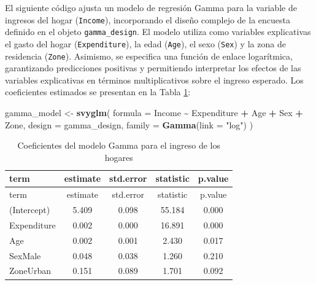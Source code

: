 \documentclass[
  spanish,
  12pt,
]{book}
\newenvironment{Shaded}{\begin{snugshade}}{\end{snugshade}}
\newcommand{\AttributeTok}[1]{\textcolor[rgb]{0.13,0.29,0.53}{#1}}
\newcommand{\FunctionTok}[1]{\textcolor[rgb]{0.13,0.29,0.53}{\textbf{#1}}}
\newcommand{\NormalTok}[1]{#1}
\newcommand{\OtherTok}[1]{\textcolor[rgb]{0.56,0.35,0.01}{#1}}
\newcommand{\SpecialCharTok}[1]{\textcolor[rgb]{0.81,0.36,0.00}{\textbf{#1}}}
\newcommand{\StringTok}[1]{\textcolor[rgb]{0.31,0.60,0.02}{#1}}
\begin{document}
El siguiente código ajusta un modelo de regresión Gamma para la variable de ingresos del hogar (\texttt{Income}), incorporando el diseño complejo de la encuesta definido en el objeto \texttt{gamma\_design}. El modelo utiliza como variables explicativas el gasto del hogar (\texttt{Expenditure}), la edad (\texttt{Age}), el sexo (\texttt{Sex}) y la zona de residencia (\texttt{Zone}). Asimismo, se especifica una función de enlace logarítmica, garantizando predicciones positivas y permitiendo interpretar los efectos de las variables explicativas en términos multiplicativos sobre el ingreso esperado. Los coeficientes estimados se presentan en la Tabla \ref{tab:tab-gamma-coeficientes}:

\begin{Shaded}
\begin{Highlighting}[]
\NormalTok{gamma\_model }\OtherTok{\textless{}{-}} \FunctionTok{svyglm}\NormalTok{(}
  \AttributeTok{formula =}\NormalTok{ Income }\SpecialCharTok{\textasciitilde{}}\NormalTok{ Expenditure }\SpecialCharTok{+}\NormalTok{ Age }\SpecialCharTok{+}\NormalTok{ Sex }\SpecialCharTok{+}\NormalTok{ Zone,}
  \AttributeTok{design =}\NormalTok{ gamma\_design,}
  \AttributeTok{family =} \FunctionTok{Gamma}\NormalTok{(}\AttributeTok{link =} \StringTok{"log"}\NormalTok{)}
\NormalTok{)}
\end{Highlighting}
\end{Shaded}

\begin{longtable}[]{@{}lcccc@{}}
\caption{\label{tab:tab-gamma-coeficientes}Coeficientes del modelo Gamma para el ingreso de los hogares}\tabularnewline
\toprule\noalign{}
term & estimate & std.error & statistic & p.value \\
\midrule\noalign{}
\endfirsthead
\toprule\noalign{}
term & estimate & std.error & statistic & p.value \\
\midrule\noalign{}
\endhead
\bottomrule\noalign{}
\endlastfoot
(Intercept) & 5.409 & 0.098 & 55.184 & 0.000 \\
Expenditure & 0.002 & 0.000 & 16.891 & 0.000 \\
Age & 0.002 & 0.001 & 2.430 & 0.017 \\
SexMale & 0.048 & 0.038 & 1.260 & 0.210 \\
ZoneUrban & 0.151 & 0.089 & 1.701 & 0.092 \\
\end{longtable}
\end{document}
